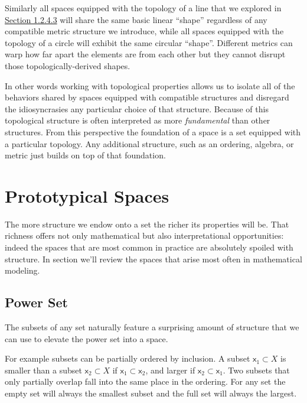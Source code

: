 \documentclass[
  letterpaper,
  DIV=11,
  numbers=noendperiod]{scrartcl}
\begin{document}
Similarly all spaces equipped with the topology of a line that we
explored in \href{@sec:general-topology}{Section 1.2.4.3} will share the
same basic linear ``shape'' regardless of any compatible metric
structure we introduce, while all spaces equipped with the topology of a
circle will exhibit the same circular ``shape''. Different metrics can
warp how far apart the elements are from each other but they cannot
disrupt those topologically-derived shapes.

In other words working with topological properties allows us to isolate
all of the behaviors shared by spaces equipped with compatible
structures and disregard the idiosyncrasies any particular choice of
that structure. Because of this topological structure is often
interpreted as more \emph{fundamental} than other structures. From this
perspective the foundation of a space is a set equipped with a
particular topology. Any additional structure, such as an ordering,
algebra, or metric just builds on top of that foundation.

\hypertarget{sec:proto-spaces}{%
\section{Prototypical Spaces}\label{sec:proto-spaces}}

The more structure we endow onto a set the richer its properties will
be. That richness offers not only mathematical but also interpretational
opportunities: indeed the spaces that are most common in practice are
absolutely spoiled with structure. In section we'll review the spaces
that arise most often in mathematical modeling.

\hypertarget{power-set}{%
\subsection{Power Set}\label{power-set}}

The subsets of any set naturally feature a surprising amount of
structure that we can use to elevate the power set into a space.

For example subsets can be partially ordered by inclusion. A subset
\(\mathsf{x}_{1} \subset X\) is smaller than a subset
\(\mathsf{x}_{2} \subset X\) if
\(\mathsf{x}_{1} \subset \mathsf{x}_{2}\), and larger if
\(\mathsf{x}_{2} \subset \mathsf{x}_{1}\). Two subsets that only
partially overlap fall into the same place in the ordering. For any set
the empty set will always the smallest subset and the full set will
always the largest.
\end{document}
